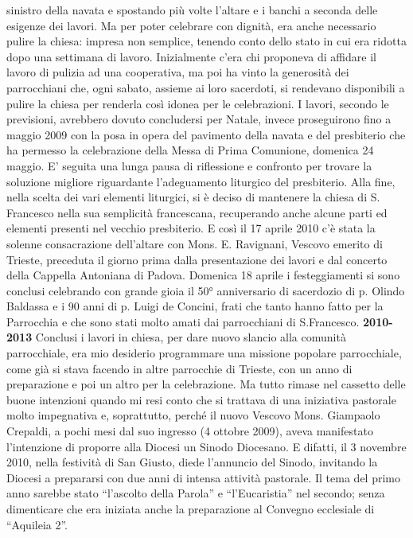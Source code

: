 sinistro della navata e spostando più volte l'altare e i banchi a seconda delle esigenze dei lavori.
Ma per poter celebrare con dignità, era anche necessario pulire la chiesa: impresa non 
semplice, tenendo conto dello stato in cui era ridotta dopo una settimana di lavoro. 
Inizialmente c'era chi proponeva di affidare il lavoro di pulizia ad una cooperativa, ma poi ha vinto 
la generosità dei parrocchiani che, ogni sabato, assieme ai loro sacerdoti, si rendevano disponibili a 
pulire la chiesa per renderla così idonea per le celebrazioni.
I lavori, secondo le previsioni, avrebbero dovuto concludersi per Natale, invece 
proseguirono fino a maggio 2009 con la posa in opera del pavimento della navata e del presbiterio 
che ha permesso la celebrazione della Messa di Prima Comunione, domenica 24 maggio. 
E' seguita una lunga pausa di riflessione e confronto per trovare la soluzione migliore riguardante 
l'adeguamento liturgico del presbiterio. Alla fine, nella scelta dei vari elementi liturgici, si è deciso 
di mantenere la chiesa di S. Francesco nella sua semplicità francescana, recuperando anche alcune 
parti ed elementi presenti nel vecchio presbiterio.
E così il 17 aprile 2010 c'è stata la solenne consacrazione dell'altare con Mons. E. 
Ravignani, Vescovo emerito di Trieste, preceduta il giorno prima dalla presentazione dei lavori e 
dal concerto della Cappella Antoniana di Padova. 
Domenica 18 aprile i festeggiamenti si sono conclusi celebrando con grande gioia il 50° 
anniversario di sacerdozio di p. Olindo Baldassa e i 90 anni di p. Luigi de Concini, frati che tanto 
hanno fatto per la Parrocchia e che sono stati molto amati dai parrocchiani di S.Francesco.
\bigbreak
\textbf{2010-2013}
\medbreak
Conclusi i lavori in chiesa, per dare nuovo slancio alla comunità parrocchiale, era mio 
desiderio programmare una missione popolare parrocchiale, come già si stava facendo in altre 
parrocchie di Trieste, con un anno di preparazione e poi un altro per la celebrazione. 
Ma tutto rimase nel cassetto delle buone intenzioni quando mi resi conto che si trattava di una 
iniziativa pastorale molto impegnativa e, soprattutto, perché il nuovo Vescovo Mons. Giampaolo 
Crepaldi, a pochi mesi dal suo ingresso (4 ottobre 2009), aveva manifestato l'intenzione di proporre 
alla Diocesi un Sinodo Diocesano. 
E difatti, il 3 novembre 2010, nella festività di San Giusto, diede l'annuncio del Sinodo, invitando la 
Diocesi a prepararsi con due anni di intensa attività pastorale. 
Il tema del primo anno sarebbe stato “l'ascolto della Parola” e “l'Eucaristia” nel secondo; senza 
dimenticare che era iniziata anche la preparazione al Convegno ecclesiale di “Aquileia 2”.
